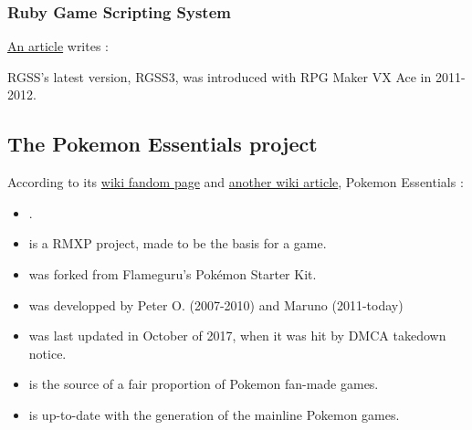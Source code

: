 \documentclass[11pt]{article}
\begin{document}


\subsubsection{Ruby Game Scripting System}

\href{https://rmvxace.fandom.com/wiki/RGSS}{An article} writes : 


RGSS's latest version, RGSS3, was introduced with RPG Maker VX Ace in 2011-2012.






\subsection{The Pokemon Essentials project}


According to its \href{https://essentialsdocs.fandom.com/wiki/Essentials_Docs_Wiki}{wiki fandom page} and \href{https://pokemon-fan-game.fandom.com/wiki/Pok\%C3\%A9mon_Essentials}{another wiki article}, Pokemon Essentials : 

\begin{itemize}
	\item {}.
	\item is a RMXP project, made to be the basis for a game.
	\item was forked from Flameguru's Pokémon Starter Kit.
	\item was developped by Peter O. (2007-2010) and Maruno (2011-today)
	\item was last updated in October of 2017, when it was hit by DMCA takedown notice.
	\item is the source of a fair proportion of Pokemon fan-made games.
	\item is up-to-date with the  generation of the mainline Pokemon games.
\end{itemize}
\end{document}
